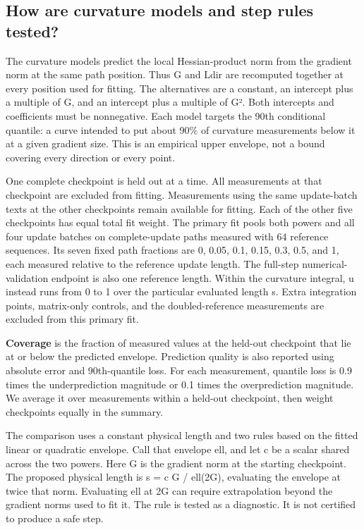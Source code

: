 \documentclass[
  14pt,
  letterpaper,
]{extarticle}
\begin{document}
\subsection{How are curvature models and step rules
tested?}\label{how-are-curvature-models-and-step-rules-tested}

The curvature models predict the local Hessian-product norm from the
gradient norm at the same path position. Thus G and Ldir are recomputed
together at every position used for fitting. The alternatives are a
constant, an intercept plus a multiple of G, and an intercept plus a
multiple of G². Both intercepts and coefficients must be nonnegative.
Each model targets the 90th conditional quantile: a curve intended to
put about 90\% of curvature measurements below it at a given gradient
size. This is an empirical upper envelope, not a bound covering every
direction or every point.

One complete checkpoint is held out at a time. All measurements at that
checkpoint are excluded from fitting. Measurements using the same
update-batch texts at the other checkpoints remain available for
fitting. Each of the other five checkpoints has equal total fit weight.
The primary fit pools both powers and all four update batches on
complete-update paths measured with 64 reference sequences. Its seven
fixed path fractions are 0, 0.05, 0.1, 0.15, 0.3, 0.5, and 1, each
measured relative to the reference update length. The full-step
numerical-validation endpoint is also one reference length. Within the
curvature integral, u instead runs from 0 to 1 over the particular
evaluated length s. Extra integration points, matrix-only controls, and
the doubled-reference measurements are excluded from this primary fit.

\textbf{Coverage} is the fraction of measured values at the held-out
checkpoint that lie at or below the predicted envelope. Prediction
quality is also reported using absolute error and 90th-quantile loss.
For each measurement, quantile loss is 0.9 times the underprediction
magnitude or 0.1 times the overprediction magnitude. We average it over
measurements within a held-out checkpoint, then weight checkpoints
equally in the summary.

The comparison uses a constant physical length and two rules based on
the fitted linear or quadratic envelope. Call that envelope ell, and let
c be a scalar shared across the two powers. Here G is the gradient norm
at the starting checkpoint. The proposed physical length is s = c G /
ell(2G), evaluating the envelope at twice that norm. Evaluating ell at
2G can require extrapolation beyond the gradient norms used to fit it.
The rule is tested as a diagnostic. It is not certified to produce a
safe step.
\end{document}
